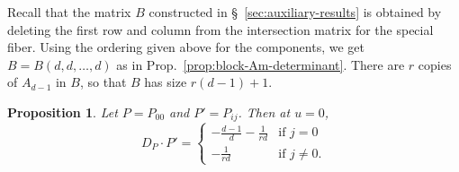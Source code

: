 \documentclass[reqno]{amsart}
\newtheorem{proposition}[thm]{Proposition}
\theoremstyle{definition}
\theoremstyle{remark}
\begin{document}
Recall that the matrix $B$ constructed in \S~\ref{sec:auxiliary-results} is obtained by deleting the first row and column from the intersection matrix for the special fiber. Using the ordering given above for the components, we get $B = B(d, d, \dots, d)$ as in Prop.~\ref{prop:block-Am-determinant}. There are $r$ copies of $A_{d-1}$ in $B$, so that $B$ has size $r(d-1) + 1$.

\begin{proposition}\label{prop:dp-u-zero}
  Let $P = P_{00}$ and $P' = P_{ij}$. Then at $u = 0$,
\[
D_P \cdot P' =
\begin{cases}
  -\frac{d-1}{d} - \frac{1}{rd} & \text{if } j = 0 \\
  -\frac{1}{rd} & \text{if } j \neq 0.
\end{cases}
\]
\end{proposition}
\end{document}
